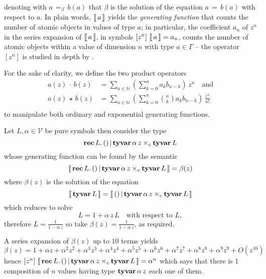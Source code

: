 denoting with $a\,=_{\beta}\,b(a)$ that $\beta$ is the solution of the equation
$a\,=\,b(a)$ with respect to $a$. In plain words, $\left\llbracket\,a\,\right\rrbracket$ yields  the
\textit{generating function} that counts the number of atomic objects in values
of type $a$; in particular, the coefficient $a_{n}$ of $z^{n}$ in the series
expansion of $\left\llbracket\,a\,\right\rrbracket$, in symbols $[z^{n}]\,\left\llbracket\,a\,\right\rrbracket = a_{n}$, counts
the number of atomic objects within a value of dimension $n$ with type
$a\in\Gamma$ -- the operator $[z^{n}]$ is studied in depth by \citet{MSV07}.

For the sake of clarity, we define the two product operators
\begin{displaymath}
\begin{split}
    a(z)\,\cdot\,b(z) &= \sum_{n\in\mathbb{N}}{\left(\sum_{k=0}^{n}{a_{k}b_{n-k}}\right)\,z^{n}}\quad\text{and}\\
    a(z)\,\star\,b(z) &= \sum_{n\in\mathbb{N}}{\left(\sum_{k=0}^{n}{{ {n}\choose{k} }a_{k}b_{n-k}}\right)\,\frac{z^{n}}{n!}} \\
\end{split}
\end{displaymath}
to manipulate both ordinary and exponential generating functions.

\begin{example}
Let $L,\alpha\in\mathcal{V}$ be pure symbols then consider the type
\begin{displaymath}
    \textbf{rec}\,L.\,()\,|\,\textbf{tyvar}\,\alpha\,z\times_{c}\textbf{tyvar}\,L
\end{displaymath}
whose generating function can be found by the semantic
\begin{displaymath}
    \left\llbracket\,\textbf{rec}\,L.\,()\,|\,\textbf{tyvar}\,\alpha\,z\times_{c}\textbf{tyvar}\,L\,\right\rrbracket = \beta(z)
\end{displaymath}
where $\beta(z)$ is the solution of the equation 
\begin{displaymath}
    \left\llbracket\,\textbf{tyvar}\,L\,\right\rrbracket = \left\llbracket\,()\,|\,\textbf{tyvar}\,\alpha\,z\times_{c}\textbf{tyvar}\,L\,\right\rrbracket
\end{displaymath}
which reduces to solve
\begin{displaymath}
    L = 1 + \alpha\,z\,L\quad\text{with respect to $L$}, 
\end{displaymath}
therefore $\displaystyle L = \frac{1}{1 - \alpha\,z}$
so take $\displaystyle \beta(z) = \frac{1}{1 - \alpha\,z}$, as required.

A series expansion of $\beta(z)$ up to $10$ terms yields
\begin{displaymath}
\beta(z) = 1 + \alpha z + \alpha^{2} z^{2} + \alpha^{3} z^{3} + \alpha^{4} z^{4} + \alpha^{5} z^{5} + \alpha^{6} z^{6} + \alpha^{7} z^{7} + \alpha^{8} z^{8} + \alpha^{9} z^{9} + O\left(z^{10}\right)
\end{displaymath}
hence $[z^{n}]\,\left\llbracket\,\textbf{rec}\,L.\,()\,|\,\textbf{tyvar}\,\alpha\,z\times_{c}\textbf{tyvar}\,L\,\right\rrbracket =
\alpha^{n}$ which says that there is $1$ composition of $n$ values having type
$\textbf{tyvar}\,\alpha\,z$ each one of them.  
\end{example}

